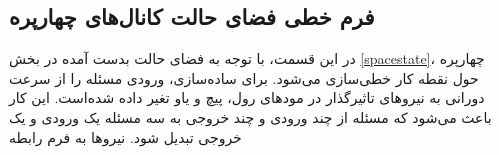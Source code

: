 \subsection{فرم خطی فضای حالت کانال‌های چهارپره}\label{lin_SISO}
در این قسمت، با توجه به فضای حالت  بدست آمده در بخش
\ref{spacestate}،
چهارپره حول نقطه کار خطی‌سازی می‌شود.
برای ساده‌سازی، ورودی مسئله را از سرعت دورانی به نیروهای تاثیرگذار در مودهای رول، پیچ و یاو تغیر داده شده‌است. این کار باعث می‌شود که مسئله از چند ورودی و چند خروجی به سه مسئله یک ورودی و یک خروجی تبدیل شود. نیروها به فرم رابطه 
